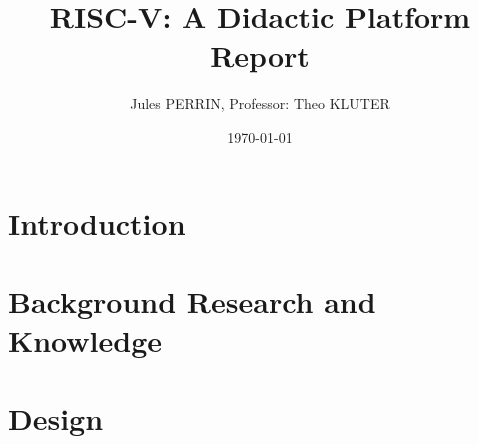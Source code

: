 \documentclass[12pt]{article}
\title{RISC-V: A Didactic Platform \\
Report}
\author{Jules PERRIN, Professor: Theo KLUTER}
\date{\today}
\begin{document}
\maketitle
\tableofcontents

\section{Introduction}




\section{Background Research and Knowledge}






\section{Design}




\printbibliography[heading=bibintoc]
\end{document}
